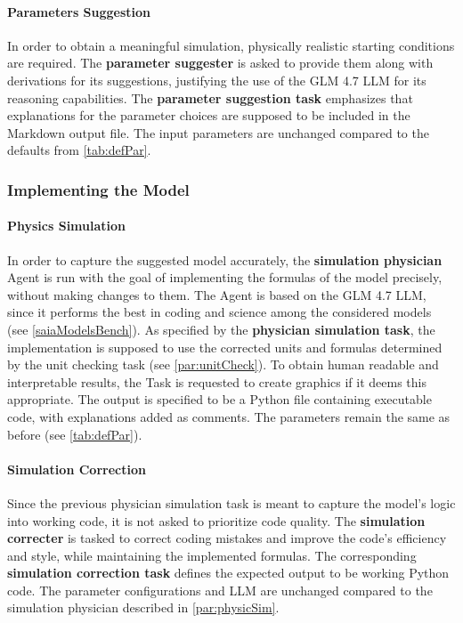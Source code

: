\documentclass[
	fontsize = 11pt,
	paper = a4,
	draft = false,
	twoside = true,
	titlepage = false
]{scrartcl}
\numberwithin{equation}{subsection}
\begin{document}
	\paragraph{Parameters Suggestion} \label{par:ParamSug}
	In order to obtain a meaningful simulation, physically realistic starting conditions are required. The \textbf{parameter suggester} is asked to provide them along with derivations for its suggestions, justifying the use of the GLM 4.7 \gls{LLM} for its reasoning capabilities. The \textbf{parameter suggestion task} emphasizes that explanations for the parameter choices are supposed to be included in the Markdown output file. The input parameters are unchanged compared to the defaults from \autoref{tab:defPar}.
	
	\subsubsection{Implementing the Model} \label{subsub:implMod}
	\paragraph{Physics Simulation} \label{par:physicSim}
	In order to capture the suggested model accurately, the \textbf{simulation physician} \gls{Agent} is run with the goal of implementing the formulas of the model precisely, without making changes to them. The \gls{Agent} is based on the GLM 4.7 \gls{LLM}, since it performs the best in coding and science among the considered models (see \autoref{saiaModelsBench}). As specified by the \textbf{physician simulation task}, the implementation is supposed to use the corrected units and formulas determined by the unit checking task (see \autoref{par:unitCheck}). To obtain human readable and interpretable results, the Task is requested to create graphics if it deems this appropriate. The output is specified to be a Python file containing executable code, with explanations added as comments. The parameters remain the same as before (see \autoref{tab:defPar}).
	
	\paragraph{Simulation Correction} \label{par:simCorrection}
	Since the previous physician simulation task is meant to capture the model's logic into working code, it is not asked to prioritize code quality. The \textbf{simulation correcter} is tasked to correct coding mistakes and improve the code's efficiency and style, while maintaining the implemented formulas. The corresponding \textbf{simulation correction task} defines the expected output to be working Python code. The parameter configurations and \gls{LLM} are unchanged compared to the simulation physician described in \autoref{par:physicSim}.
	
\end{document}
